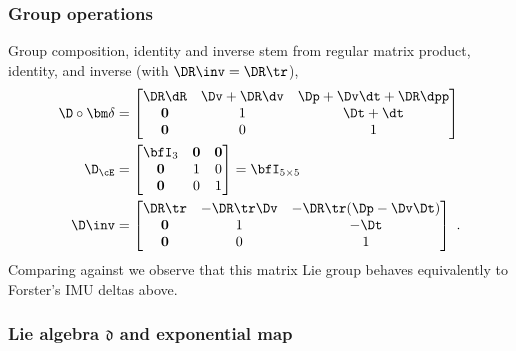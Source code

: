 \subsubsection{Group operations}
Group composition, identity and inverse stem from regular matrix product, identity, and inverse (with $\DR\inv=\DR\tr$),
%
\begin{align}
    \D\circ\bm\delta 
    &= 
    \begin{bmatrix}
    \DR\dR & \Dv + \DR\dv & \Dp+\Dv\dt + \DR\dpp \\
    \bf0 & 1 & \Dt+\dt \\
    \bf0 & 0 & 1
    \end{bmatrix}
    \label{eq:compact_composition}
    \\
    \D_\cE&=\begin{bmatrix}
    \bfI_3 & \bf0 & \bf0 \\
    \bf0 & 1 & 0 \\
    \bf0 & 0 & 1 
    \end{bmatrix} = \bfI_{5\times5}
    \label{equ:identity}
    \\
    \D\inv &= \begin{bmatrix}
    \DR\tr & -\DR\tr\Dv & -\DR\tr(\Dp-\Dv\Dt) \\
    \bf0 & 1 & -\Dt \\
    \bf0 & 0 & 1
    \end{bmatrix} ~.
    \label{equ:inverse}
\end{align}
%
Comparing against  we observe that this matrix Lie group behaves equivalently to Forster's IMU deltas above.


\subsubsection{Lie algebra \texorpdfstring{$\mathfrak{d}$}{d} and exponential map}

